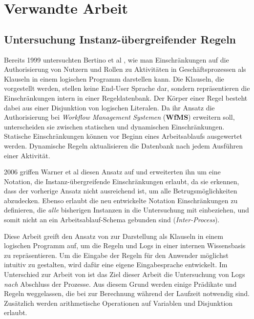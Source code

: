 
\chapter{Verwandte Arbeit} %

\label{Chapter3} %



\section{Untersuchung Instanz-übergreifender Regeln}
Bereits 1999 untersuchten Bertino et al \cite{Bertino}, wie man Einschränkungen auf die Authorisierung von Nutzern und Rollen zu Aktivitäten in Geschäftsprozessen als Klauseln in einem logischen Programm darstellen kann. Die Klauseln, die vorgestellt werden, stellen keine End-User Sprache dar, sondern repräsentieren die Einschränkungen intern in einer Regeldatenbank. Der Körper einer Regel besteht dabei aus einer Disjunktion von logischen Literalen. Da ihr Ansatz die Authorisierung bei \textit{Workflow Management Systemen} (\textbf{WfMS}) erweitern soll, unterscheiden sie zwischen statischen und dynamischen Einschränkungen. Statische Einschränkungen können vor Beginn eines Arbeitsablaufs ausgewertet werden. Dynamische Regeln aktualisieren die Datenbank nach jedem Ausführen einer Aktivität.

2006 griffen Warner et al \cite{warner_inter_instance} diesen Ansatz auf und erweiterten ihn um eine Notation, die Instanz-übergreifende Einschränkungen erlaubt, da sie erkennen, dass der vorherige Ansatz nicht ausreichend ist, um alle Betrugsmöglichkeiten abzudecken. Ebenso erlaubt die neu entwickelte Notation Einschränkungen zu definieren, die \textit{alle} bisherigen Instanzen in die Untersuchung mit einbeziehen, und somit nicht an ein Arbeitsablauf-Schema gebunden sind (\textit{Inter-Process}).

Diese Arbeit greift den Ansatz von \cite{warner_inter_instance} zur Darstellung als Klauseln in einem logischen Programm auf, um die Regeln und Logs in einer internen Wissensbasis zu repräsentieren. Um die Eingabe der Regeln für den Anwender möglichst intuitiv zu gestalten, wird dafür eine eigene Eingabesprache entwickelt. Im Unterschied zur Arbeit von \cite{warner_inter_instance} ist das Ziel dieser Arbeit die Untersuchung von Logs \textit{nach} Abschluss der Prozesse. Aus diesem Grund werden einige Prädikate und Regeln weggelassen, die bei \cite{warner_inter_instance} zur Berechnung während der Laufzeit notwendig sind. Zusätzlich werden arithmetische Operationen auf Variablen und Disjunktion erlaubt.

